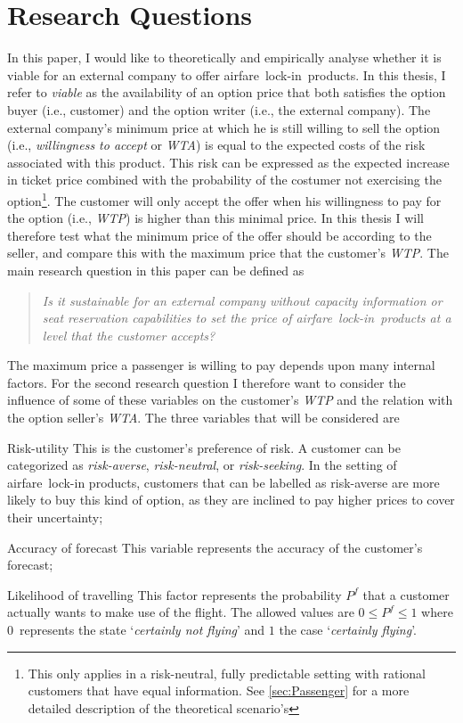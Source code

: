 \chapter{Research Questions}
\label{chap:ResearchQuestions}
In this paper, I would like to theoretically and empirically analyse whether it is viable for an external company to offer airfare~lock-in~products. In this thesis, I refer to \emph{viable} as the availability of an option price that both satisfies the option buyer (i.e., customer) and the option writer (i.e., the external company). The external company's minimum price at which he is still willing to sell the option (i.e., \emph{willingness to accept} or \emph{WTA}) is equal to the expected costs of the risk associated with this product. This risk can be expressed as the expected increase in ticket price combined with the probability of the costumer not exercising the option\footnote{This only applies in a risk-neutral, fully predictable setting with rational customers that have equal information. See \autoref{sec:Passenger} for a more detailed description of the theoretical scenario's}. The customer will only accept the offer when his willingness to pay for the option (i.e., \emph{WTP}) is higher than this minimal price. In this thesis I will therefore test what the minimum price of the offer should be according to the seller, and compare this with the maximum price that the customer's \emph{WTP}. The main research question in this paper can be defined as

\begin{quote}\emph{Is it sustainable for an external company without capacity information or seat reservation capabilities to set the price of airfare~lock-in~products at a level that the customer accepts?}\end{quote}

The maximum price a passenger is willing to pay depends upon many internal factors. For the second research question I therefore want to consider the influence of some of these variables on the customer's \emph{WTP} and the relation with the option seller's \emph{WTA}. The three variables that will be considered are
\begin{compactdesc}
\item[Risk-utility] This is the customer's preference of risk. A customer can be categorized as \emph{risk-averse}, \emph{risk-neutral}, or \emph{risk-seeking}. In the setting of airfare~lock-in products, customers that can be labelled as risk-averse are more likely to buy this kind of option, as they are inclined to pay higher prices to cover their uncertainty;
\item[Accuracy of forecast] This variable represents the accuracy of the customer's forecast; 
\item[Likelihood of travelling] This factor represents the probability $P^f$ that a customer actually wants to make use of the flight. The allowed values are $0 \le P^f \le 1$ where $0$~represents the state `\emph{certainly not flying}' and $1$ the case  `\emph{certainly flying}'.
\vspace{1em}
\end{compactdesc}

